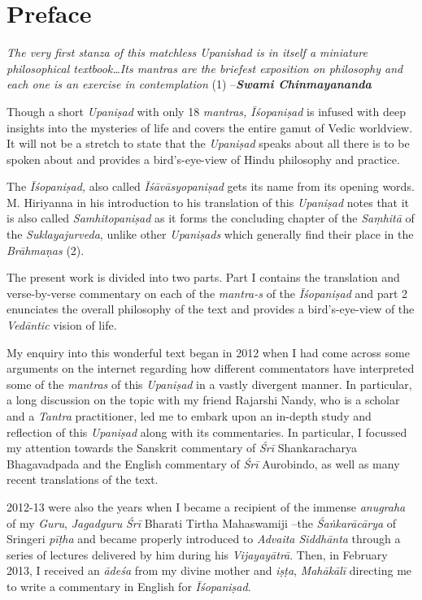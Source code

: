 \chapter{Preface}

\begin{center}
\emph{The very first stanza of this matchless Upanishad is in itself a miniature philosophical textbook\ldots{}Its mantras are the briefest exposition on philosophy and each one is an exercise in contemplation} (1) --\emph{\textbf{Swami Chinmayananda}}
\end{center}

Though a short \emph{Upaniṣad} with only 18 \emph{mantras, Īśopaniṣad} is infused with deep insights into the mysteries of life and covers the entire gamut of Vedic worldview. It will not be a stretch to state that the \emph{Upaniṣad} speaks about all there is to be spoken about and provides a bird's-eye-view of Hindu philosophy and practice.

The \emph{Īśopaniṣad,} also called \emph{Īśāvāsyopaniṣad} gets its name from its opening words. M. Hiriyanna in his introduction to his translation of this \emph{Upaniṣad} notes that it is also called \emph{Samhitopaniṣad} as it forms the concluding chapter of the \emph{Saṃhitā} of the \emph{Suklayajurveda}, unlike other \emph{Upaniṣads} which generally find their place in the \emph{Brāhmaṇas} (2).

The present work is divided into two parts. Part I contains the translation and verse-by-verse commentary on each of the \emph{mantra-s} of the \emph{Īśopaniṣad} and part 2 enunciates the overall philosophy of the text and provides a bird's-eye-view of the \emph{Vedāntic} vision of life.

My enquiry into this wonderful text began in 2012 when I had come across some arguments on the internet regarding how different commentators have interpreted some of the \emph{mantras} of this \emph{Upaniṣad} in a vastly divergent manner. In particular, a long discussion on the topic with my friend Rajarshi Nandy, who is a scholar and a \emph{Tantra} practitioner, led me to embark upon an in-depth study and reflection of this \emph{Upaniṣad} along with its commentaries. In particular, I focussed my attention towards the Sanskrit commentary of \emph{Śrī} Shankaracharya Bhagavadpada and the English commentary of \emph{Śrī} Aurobindo, as well as many recent translations of the text.

2012-13 were also the years when I became a recipient of the immense \emph{anugraha} of my \emph{Guru}, \emph{Jagadguru} \emph{Śrī} Bharati Tirtha Mahaswamiji --the \emph{Śaṅkarācārya} of Sringeri \emph{pīṭha} and became properly introduced to \emph{Advaita Siddhānta} through a series of lectures delivered by him during his \emph{Vijayayātrā}. Then, in February 2013, I received an \emph{ādeśa} from my divine mother and \emph{iṣṭa}, \emph{Mahākālī} directing me to write a commentary in English for \emph{Īśopaniṣad}.

